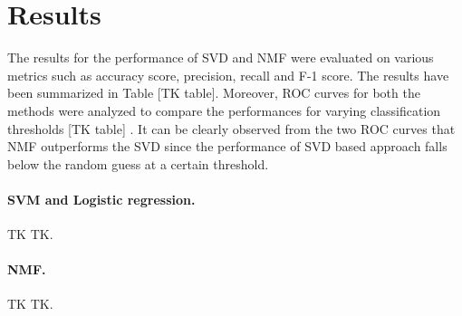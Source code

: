 \documentclass{article} %
\begin{document}
\section{Results}

The results for the performance of SVD and NMF were evaluated on various metrics such as accuracy score, precision, recall and F-1 score. The results have been summarized in Table [TK table]. Moreover, ROC curves for both the methods were analyzed to compare the performances for varying classification thresholds [TK table] . It can be clearly observed from the two ROC curves that NMF outperforms the SVD since the performance of SVD based approach falls below the random guess at a certain threshold.

\paragraph{SVM and Logistic regression.} TK TK.

\paragraph{NMF.} TK TK.
\end{document}
